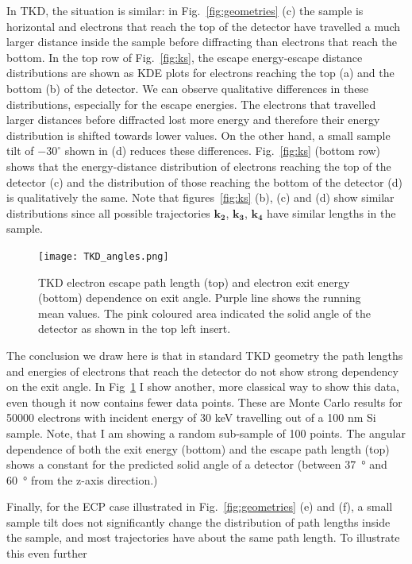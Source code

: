 In TKD, the situation is similar: in Fig.~\ref{fig:geometries} (c) the sample is horizontal and electrons that reach the top of the detector have travelled a much larger distance inside the sample before diffracting than electrons that reach the bottom. In the top row of Fig.~\ref{fig:ks}, the escape energy-escape distance distributions are shown as KDE plots for electrons reaching the top (a) and the bottom (b) of the detector. We can observe qualitative differences in these distributions, especially for the escape energies. The electrons that travelled larger distances before diffracted lost more energy and therefore their energy distribution is shifted towards lower values. On the other hand, a small sample tilt of $-30^{\circ}$ shown in (d) reduces these differences. Fig.~\ref{fig:ks} (bottom row) shows that the energy-distance distribution of electrons reaching the top of the detector (c) and the distribution of those reaching the bottom of the detector (d) is qualitatively the same. Note that figures~\ref{fig:ks} (b), (c) and (d) show similar distributions since all possible trajectories $\mathbf{k_2}$, $\mathbf{k_3}$, $\mathbf{k_4}$ have similar lengths in the sample.

\begin{figure}[ht]
\centering
\texttt{[image: TKD\_angles.png]}
\caption[Mean angular dependence of exit energies in TKD]{TKD electron escape path length  (top) and electron exit energy (bottom) dependence on exit angle. Purple line shows the running mean values. The pink coloured area indicated the solid angle of the detector as shown in the top left insert.}
\label{fig:angles}
\end{figure}


The conclusion we draw here is that in standard TKD geometry the path lengths and energies of electrons that reach the detector do not show strong dependency on the exit angle. In Fig~\ref{fig:angles} I show another, more classical way to show this data, even though it now contains fewer data points. These are Monte Carlo results for 50000 electrons with incident energy of 30 keV travelling out of a 100 nm Si sample. Note, that I am showing a random sub-sample of 100 points. The angular dependence of both the exit energy (bottom) and the escape path length (top) shows a constant for the predicted solid angle of a detector (between \SI{37}{\degree} and \SI{60}{\degree} from the z-axis direction.) 




Finally, for the ECP case illustrated in Fig.~\ref{fig:geometries} (e) and (f), a small sample tilt does not significantly change the distribution of path lengths inside the sample, and most trajectories have about the same path length. To illustrate this even further


